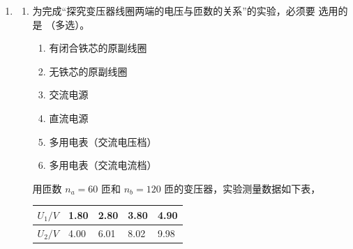 \begin{enumerate}
\begin{enumerate}
\end{enumerate}



\item 
{}
\begin{enumerate}
\item
为完成“探究变压器线圈两端的电压与匝数的关系”的实验，必须要
选用的是
\underlinegap 
（多选）。
\begin{multicols}{2} 
\begin{enumerate}
\renewcommand{\labelenumiii}{\Alph{enumiii}.}
\item
有闭合铁芯的原副线圈

\item 
无铁芯的原副线圈

\item 
交流电源

\item 
直流电源

\item 
多用电表（交流电压档）

\item 
多用电表（交流电流档）




\end{enumerate}


\end{multicols}


用匝数 $ n_a=60 $ 匝和 $ n_b=120 $ 匝的变压器，实验测量数据如下表，
\begin{table}[h!]
\centering 
\begin{tabular}{|l|l|l|l|l|}
\hline$U_{1} / V$ & 1.80 & 2.80 & 3.80 & 4.90 \\
\hline$U_{2} / V$ & 4.00 & 6.01 & 8.02 & 9.98 \\
\hline
\end{tabular}
\end{table} 




\end{enumerate}
\end{enumerate}
